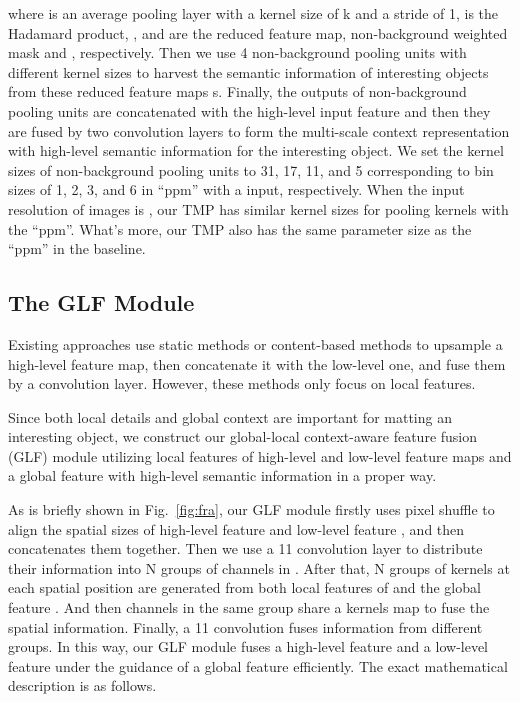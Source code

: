 \documentclass[10pt,twocolumn,letterpaper]{article}
\begin{document}
where  is an average pooling layer with a kernel size of  k and a stride of 1,  is the Hadamard product, ,  and   are the reduced feature map, non-background weighted mask and , respectively. Then we use 4  non-background pooling units with different kernel sizes to harvest the semantic information of interesting objects from these reduced feature maps s. Finally, the outputs of non-background pooling units are concatenated with the high-level input feature  and then they are fused by two  convolution layers to form the  multi-scale context representation with high-level semantic information for the interesting object. We set the kernel sizes of non-background pooling units to 31, 17, 11, and 5 corresponding to bin sizes of 1, 2, 3, and 6 in  ``ppm'' with a  input, respectively. When the input resolution of images is , our TMP has similar kernel sizes for pooling kernels  with the ``ppm''. What's more, our TMP also has the same parameter size as the ``ppm'' in  the baseline. 





\subsection{The GLF Module}
Existing approaches use static methods \cite{fba,gca}  or content-based  methods \cite{carafe,a2u} to upsample a high-level feature map, then concatenate it with the low-level one, and fuse them by a convolution layer. However, these methods only focus  on  local features. 

Since both local details and global context are important for matting an interesting object, we construct our global-local  context-aware feature fusion (GLF) module utilizing local features of high-level and low-level feature maps and a global feature with high-level semantic information in a proper way. 

As is briefly shown in Fig.~\ref{fig:fra}, our GLF module firstly uses pixel shuffle \cite{ps} to align the spatial sizes of high-level feature  and low-level feature , and then concatenates them together. Then we use a 11 convolution layer to distribute their information into N groups of channels in . After that, N groups of  kernels at each spatial position  are generated from both local features of  and the global feature . And then channels in the same group share a kernels map to fuse the spatial information. Finally,   a 11 convolution fuses information from different groups. In this way, our GLF module fuses a high-level feature and a low-level feature under the guidance of a global feature efficiently. The exact mathematical description is as follows.
\end{document}
